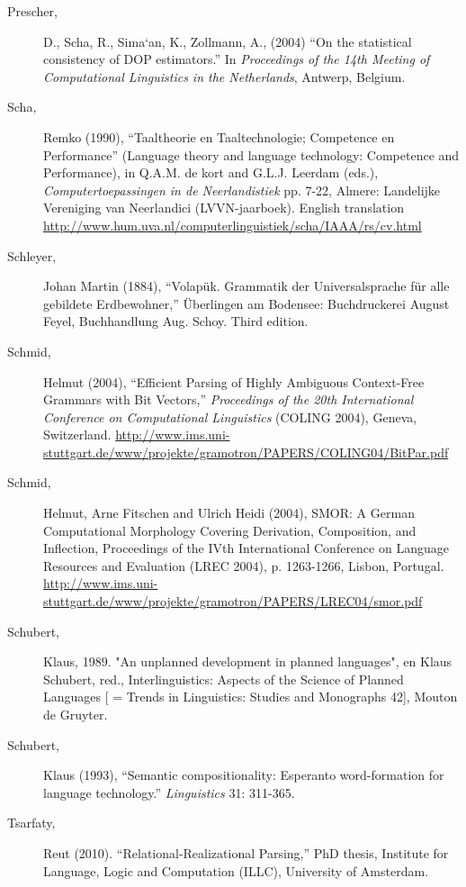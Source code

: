 \documentclass[10pt,a4paper]{article}
\begin{document}
\begin{description}
\item[Prescher,] D., Scha, R., Sima`an, K., Zollmann, A., (2004) ``On the statistical
consistency of DOP estimators.'' In {\em Proceedings of the 14th Meeting of
Computational Linguistics in the Netherlands}, Antwerp, Belgium.

\item[Scha,] Remko (1990), ``Taaltheorie en Taaltechnologie; Competence en
Performance'' (Language theory and language technology: Competence and
Performance), in Q.A.M. de kort and G.L.J. Leerdam (eds.), {\em Computertoepassingen in de Neerlandistiek} pp. 7-22, Almere: Landelijke
Vereniging van Neerlandici (LVVN-jaarboek). English translation
\url{http://www.hum.uva.nl/computerlinguistiek/scha/IAAA/rs/cv.html}

\item[Schleyer,] Johan Martin (1884), ``Volap\"uk. Grammatik der Universalsprache f\"ur
alle gebildete Erdbewohner,'' \"Uberlingen am Bodensee: Buchdruckerei August
Feyel, Buchhandlung Aug. Schoy. Third edition.

\item[Schmid,] Helmut (2004), ``Efficient Parsing of Highly Ambiguous Context-Free
Grammars with Bit Vectors,'' {\em Proceedings of the 20th International Conference
on Computational Linguistics} (COLING 2004), Geneva, Switzerland.
\url{http://www.ims.uni-stuttgart.de/www/projekte/gramotron/PAPERS/COLING04/BitPar.pdf}

\item[Schmid,] Helmut, Arne Fitschen and Ulrich Heidi (2004), SMOR: A German Computational Morphology Covering Derivation, Composition, and Inflection, Proceedings of the IVth International Conference on Language Resources and Evaluation (LREC 2004), p. 1263-1266, Lisbon, Portugal. \url{http://www.ims.uni-stuttgart.de/www/projekte/gramotron/PAPERS/LREC04/smor.pdf}

\item[Schubert,] Klaus, 1989. "An unplanned development in planned languages", en Klaus Schubert, red., Interlinguistics: Aspects of the Science of Planned Languages [ = Trends in Linguistics: Studies and Monographs 42], Mouton de Gruyter.

\item[Schubert,] Klaus (1993), ``Semantic compositionality: Esperanto
word-formation for language technology.'' {\em Linguistics} 31: 311-365.

\item[Tsarfaty,] Reut (2010). ``Relational-Realizational Parsing,'' PhD thesis, Institute for Language, Logic and Computation (ILLC), University of Amsterdam.


\end{description}
\end{document}
